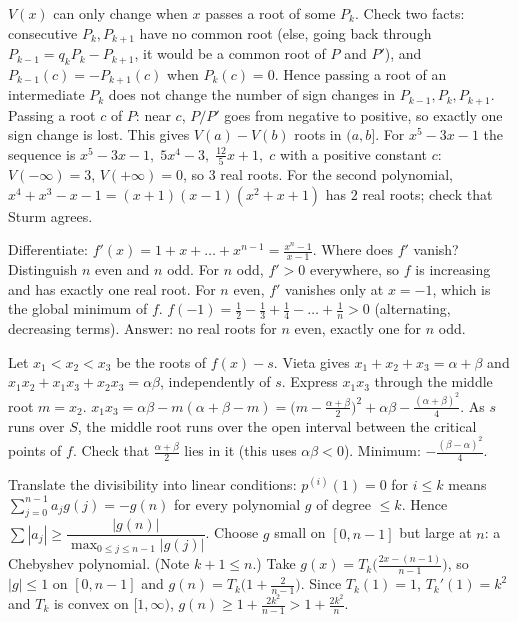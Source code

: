 \documentclass[11pt,a4paper]{article}
\begin{document}

 $V(x)$ can only change when $x$ passes a root of some $P_k$. Check two facts: consecutive $P_k,P_{k+1}$ have no common root (else, going back through $P_{k-1}=q_kP_k-P_{k+1}$, it would be a common root of $P$ and $P'$), and $P_{k-1}(c)=-P_{k+1}(c)$ when $P_k(c)=0$.
 Hence passing a root of an intermediate $P_k$ does not change the number of sign changes in $P_{k-1},P_k,P_{k+1}$. Passing a root $c$ of $P$: near $c$, $P/P'$ goes from negative to positive, so exactly one sign change is lost. This gives $V(a)-V(b)$ roots in $(a,b]$.
 For $x^5-3x-1$ the sequence is $x^5-3x-1,\;5x^4-3,\;\frac{12}5x+1,\;c$ with a positive constant $c$: $V(-\infty)=3$, $V(+\infty)=0$, so $3$ real roots. For the second polynomial, $x^4+x^3-x-1=(x+1)(x-1)(x^2+x+1)$ has $2$ real roots; check that Sturm agrees.

 Differentiate: $f'(x)=1+x+\dots+x^{n-1}=\frac{x^n-1}{x-1}$. Where does $f'$ vanish? Distinguish $n$ even and $n$ odd.
 For $n$ odd, $f'>0$ everywhere, so $f$ is increasing and has exactly one real root. For $n$ even, $f'$ vanishes only at $x=-1$, which is the global minimum of $f$.
 $f(-1)=\frac12-\frac13+\frac14-\dots+\frac1n>0$ (alternating, decreasing terms). Answer: no real roots for $n$ even, exactly one for $n$ odd.

 Let $x_1<x_2<x_3$ be the roots of $f(x)-s$. Vieta gives $x_1+x_2+x_3=\alpha+\beta$ and $x_1x_2+x_1x_3+x_2x_3=\alpha\beta$, independently of $s$. Express $x_1x_3$ through the middle root $m=x_2$.
 $x_1x_3=\alpha\beta-m(\alpha+\beta-m)=\bigl(m-\frac{\alpha+\beta}2\bigr)^2+\alpha\beta-\frac{(\alpha+\beta)^2}4$.
 As $s$ runs over $S$, the middle root runs over the open interval between the critical points of $f$. Check that $\frac{\alpha+\beta}2$ lies in it (this uses $\alpha\beta<0$). Minimum: $-\frac{(\beta-\alpha)^2}{4}$.

 Translate the divisibility into linear conditions: $p^{(i)}(1)=0$ for $i\le k$ means $\sum_{j=0}^{n-1}a_jg(j)=-g(n)$ for every polynomial $g$ of degree $\le k$.
 Hence $\sum|a_j|\ge\dfrac{|g(n)|}{\max_{0\le j\le n-1}|g(j)|}$. Choose $g$ small on $[0,n-1]$ but large at $n$: a Chebyshev polynomial. (Note $k+1\le n$.)
 Take $g(x)=T_k\bigl(\frac{2x-(n-1)}{n-1}\bigr)$, so $|g|\le1$ on $[0,n-1]$ and $g(n)=T_k\bigl(1+\frac2{n-1}\bigr)$. Since $T_k(1)=1$, $T_k'(1)=k^2$ and $T_k$ is convex on $[1,\infty)$, $g(n)\ge1+\frac{2k^2}{n-1}>1+\frac{2k^2}n$.
\end{document}
